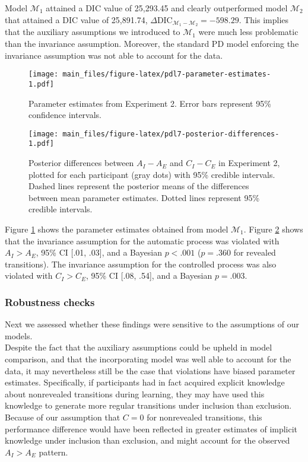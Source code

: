\documentclass[english,,man]{apa6}
\begin{document}
Model \(\mathcal{M}_1\) attained a DIC value of 25,293.45 and clearly outperformed model \(\mathcal{M}_2\) that attained a DIC value of 25,891.74, \(\Delta \textrm{DIC}_{\mathcal{M}_1 - \mathcal{M}_2} = -598.29\).
This implies that the auxiliary assumptions we introduced to \(\mathcal{M}_1\) were much less problematic than the invariance assumption.
Moreover, the standard PD model enforcing the invariance assumption was not able to account for the data.

\begin{figure}
\centering
\texttt{[image: main\_files/figure-latex/pdl7-parameter-estimates-1.pdf]}
\caption{\label{fig:pdl7-parameter-estimates}Parameter estimates from Experiment 2. Error bars represent 95\% confidence intervals.}
\end{figure}

\begin{figure}
\centering
\texttt{[image: main\_files/figure-latex/pdl7-posterior-differences-1.pdf]}
\caption{\label{fig:pdl7-posterior-differences}Posterior differences between \(A_I - A_E\) and \(C_I - C_E\) in Experiment 2, plotted for each participant (gray dots) with 95\% credible intervals. Dashed lines represent the posterior means of the differences between mean parameter estimates. Dotted lines represent 95\% credible intervals.}
\end{figure}

Figure \ref{fig:pdl7-parameter-estimates} shows the parameter estimates obtained from model \(\mathcal{M}_1\).
Figure \ref{fig:pdl7-posterior-differences} shows that the invariance assumption for the automatic process was violated with
\(A_I > A_E\), 95\% CI {[}.01, .03{]}, and a Bayesian \(p < .001\) (\(p = .360\) for revealed transitions).
The invariance assumption for the controlled process was also violated with
\(C_I > C_E\), 95\% CI {[}.08, .54{]}, and a Bayesian \(p = .003\).

\hypertarget{robustness-checks}{%
\subsubsection{Robustness checks}\label{robustness-checks}}

Next we assessed whether these findings were sensitive to the assumptions of our models.\\
Despite the fact that the auxiliary assumptions could be upheld in model comparison, and that the incorporating model was well able to account for the data,
it may nevertheless still be the case that violations have biased parameter estimates.
Specifically, if participants had in fact acquired explicit knowledge about nonrevealed transitions during learning,
they may have used this knowledge to generate more regular transitions under inclusion than exclusion.
Because of our assumption that \(C = 0\) for nonrevealed transitions, this performance difference would have been reflected in greater estimates of implicit knowledge under inclusion than exclusion, and might account for the observed \(A_{I} > A_{E}\) pattern.
\end{document}
